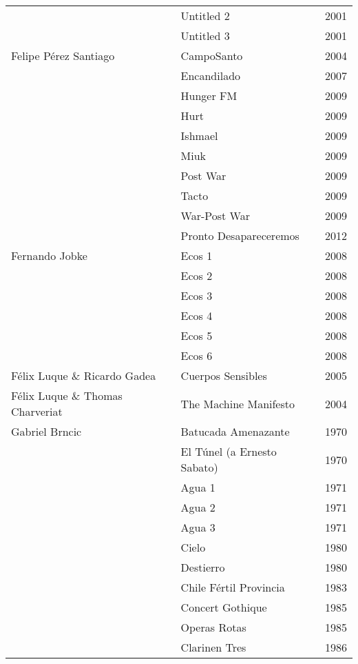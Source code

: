 \begin{center}
\begin{longtable}{ p{}  p{}  p{} }
& Untitled 2 & 2001 \\ \cmidrule (r){2-3} 
& Untitled 3 & 2001 \\ \midrule 
Felipe Pérez Santiago & CampoSanto & 2004 \\ \cmidrule (r){2-3} 
& Encandilado & 2007 \\ \cmidrule (r){2-3} 
& Hunger FM & 2009 \\ \cmidrule (r){2-3} 
& Hurt & 2009 \\ \cmidrule (r){2-3} 
& Ishmael & 2009 \\ \cmidrule (r){2-3} 
& Miuk & 2009 \\ \cmidrule (r){2-3} 
& Post War & 2009 \\ \cmidrule (r){2-3} 
& Tacto & 2009 \\ \cmidrule (r){2-3} 
& War-Post War & 2009 \\ \cmidrule (r){2-3} 
& Pronto Desapareceremos & 2012 \\ \midrule 
Fernando Jobke & Ecos 1 & 2008 \\ \cmidrule (r){2-3} 
& Ecos 2 & 2008 \\ \cmidrule (r){2-3} 
& Ecos 3 & 2008 \\ \cmidrule (r){2-3} 
& Ecos 4 & 2008 \\ \cmidrule (r){2-3} 
& Ecos 5 & 2008 \\ \cmidrule (r){2-3} 
& Ecos 6 & 2008 \\ \midrule 
Félix Luque \& Ricardo Gadea & Cuerpos Sensibles & 2005 \\ \midrule 
Félix Luque \& Thomas Charveriat & The Machine Manifesto & 2004 \\ \midrule 
Gabriel Brncic & Batucada Amenazante & 1970 \\ \cmidrule (r){2-3} 
& El Túnel (a Ernesto Sabato) & 1970 \\ \cmidrule (r){2-3} 
& Agua 1 & 1971 \\ \cmidrule (r){2-3} 
& Agua 2 & 1971 \\ \cmidrule (r){2-3} 
& Agua 3 & 1971 \\ \cmidrule (r){2-3} 
& Cielo & 1980 \\ \cmidrule (r){2-3} 
& Destierro & 1980 \\ \cmidrule (r){2-3} 
& Chile Fértil Provincia & 1983 \\ \cmidrule (r){2-3} 
& Concert Gothique & 1985 \\ \cmidrule (r){2-3} 
& Operas Rotas & 1985 \\ \cmidrule (r){2-3} 
& Clarinen Tres & 1986 \\ \cmidrule (r){2-3} 

\end{longtable}
\end{center}
